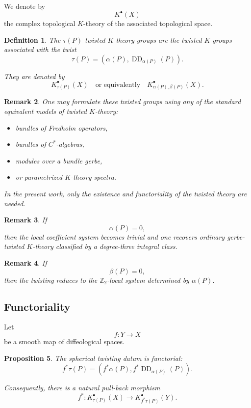 \documentclass[11pt]{amsart}
\newtheorem{definition}{Definition}[section]
\newtheorem{proposition}[definition]{Proposition}
\newtheorem{remark}[definition]{Remark}
\begin{document}
We denote by
\[
K^\bullet(X)
\]
the complex topological \(K\)-theory of the associated topological space.

\begin{definition}
The \emph{\(\tau(P)\)-twisted \(K\)-theory groups} are the twisted
\(K\)-groups associated with the twist
\[
\tau(P)
=
(\alpha(P),\operatorname{DD}_{\alpha(P)}(P)).
\]

They are denoted by
\[
K^\bullet_{\tau(P)}(X)
\quad\text{or equivalently}\quad
K^\bullet_{\alpha(P),\beta(P)}(X).
\]
\end{definition}

\begin{remark}
One may formulate these twisted groups using any of the standard equivalent
models of twisted \(K\)-theory:
\begin{itemize}
\item bundles of Fredholm operators,
\item bundles of \(C^*\)-algebras,
\item modules over a bundle gerbe,
\item or parametrized \(K\)-theory spectra.
\end{itemize}

In the present work, only the existence and functoriality of the twisted theory
are needed.
\end{remark}

\begin{remark}
If
\[
\alpha(P)=0,
\]
then the local coefficient system becomes trivial and one recovers ordinary
gerbe-twisted \(K\)-theory classified by a degree-three integral class.
\end{remark}

\begin{remark}
If
\[
\beta(P)=0,
\]
then the twisting reduces to the \(\mathbb Z_2\)-local system determined by
\(\alpha(P)\).
\end{remark}

\subsection{Functoriality}

Let
\[
f:Y\longrightarrow X
\]
be a smooth map of diffeological spaces.

\begin{proposition}
The spherical twisting datum is functorial:
\[
f^*\tau(P)
=
(f^*\alpha(P),f^*\operatorname{DD}_{\alpha(P)}(P)).
\]

Consequently, there is a natural pull-back morphism
\[
f^*:
K^\bullet_{\tau(P)}(X)
\longrightarrow
K^\bullet_{f^*\tau(P)}(Y).
\]
\end{proposition}
\end{document}
